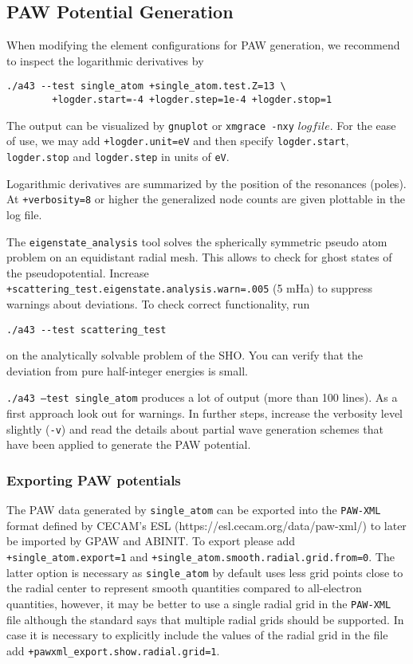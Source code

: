 \documentclass[oribibl]{llncs}
\newcommand{\ttt}[1]{\texttt{#1}}
\begin{document}
\subsection{PAW Potential Generation} \label{sec:single-atom}
%
When modifying the element configurations for \ac{PAW} generation,
we recommend to inspect the logarithmic derivatives by
\begin{verbatim}
./a43 --test single_atom +single_atom.test.Z=13 \
        +logder.start=-4 +logder.step=1e-4 +logder.stop=1
\end{verbatim}
The output can be visualized by \ttt{gnuplot} or \ttt{xmgrace -nxy} $logfile$.
%
\noindent
For the ease of use, we may add \ttt{+logder.unit=eV} and then specify
\ttt{logder.start}, \ttt{logder.stop} and \ttt{logder.step} in units of \ttt{eV}.

\noindent
Logarithmic derivatives are summarized by the position of the resonances (poles).
At \ttt{+verbosity=8} or higher the generalized node counts are given plottable in the log file.

\noindent
The \ttt{eigenstate\_analysis} tool solves the spherically symmetric pseudo atom
problem on an equidistant radial mesh. This allows to check for ghost states of the pseudopotential.
Increase \ttt{+scattering\_test.eigenstate.analysis.warn=.005} (5 mHa) to suppress warnings about deviations.
To check correct functionality, run
\begin{verbatim}
./a43 --test scattering_test
\end{verbatim}
on the analytically solvable problem of the \ac{SHO}.
You can verify that the deviation from pure half-integer energies is small.

\noindent
\ttt{./a43 --test single\_atom} produces a lot of output (more than 100 lines).
As a first approach look out for warnings.
In further steps, increase the verbosity level slightly (\ttt{-v}) and read the details about partial wave generation schemes that have been applied to generate the \ac{PAW} potential.

\subsubsection{Exporting PAW potentials} \label{sec:single-atom-export}
%
The \ac{PAW} data generated by \ttt{single\_atom} can be exported into the \ttt{PAW-XML} format defined
by CECAM's ESL\cite{CECAM_Electronic_Structure_Library} (https://esl.cecam.org/data/paw-xml/)
to later be imported by GPAW\cite{gpaw} and ABINIT\cite{abinit}.
To export please add \ttt{+single\_atom.export=1} and \ttt{+single\_atom.smooth.radial.grid.from=0}.
The latter option is necessary as \ttt{single\_atom} by default uses less grid points close to the radial center 
to represent smooth quantities compared to all-electron quantities, 
however, it may be better to use a single radial grid in the \ttt{PAW-XML} file
although the standard says that multiple radial grids should be supported.
In case it is necessary to explicitly include the values of the radial grid in the file add 
\ttt{+pawxml\_export.show.radial.grid=1}.
\end{document}
